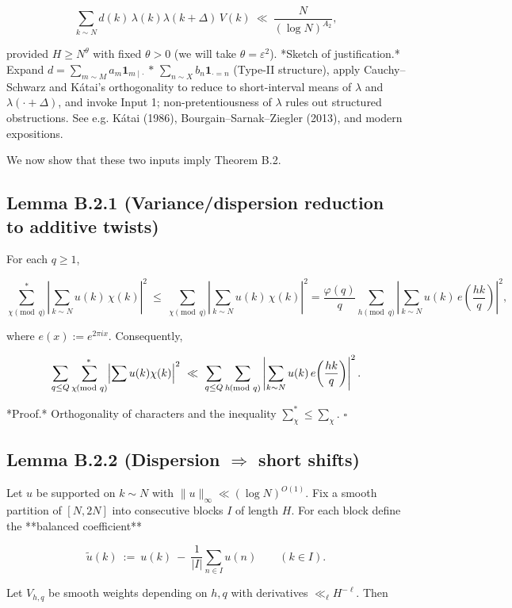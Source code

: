 \documentclass[11pt]{article}
\theoremstyle{definition}
\theoremstyle{remark}
\begin{document}
$$
\sum_{k\sim N} d(k)\,\lambda(k)\lambda(k+\Delta)\,V(k)
\ \ll\ \frac{N}{(\log N)^{A_2}},
$$

provided $H\ge N^{\theta}$ with fixed $\theta>0$ (we will take $\theta=\varepsilon^2$).
*Sketch of justification.* Expand $d=\sum_{m\sim M} a_m \mathbf{1}_{m\mid \cdot}\,*\,\sum_{n\sim X} b_n \mathbf{1}_{\cdot=n}$ (Type-II structure), apply Cauchy–Schwarz and Kátai’s orthogonality to reduce to short-interval means of $\lambda$ and $\lambda(\cdot+\Delta)$, and invoke Input 1; non-pretentiousness of $\lambda$ rules out structured obstructions. See e.g. Kátai (1986), Bourgain–Sarnak–Ziegler (2013), and modern expositions.

We now show that these two inputs imply Theorem B.2.

\subsection*{Lemma B.2.1 (Variance/dispersion reduction to additive twists)}

For each $q\ge 1$,

$$
\sum_{\chi\!\!\!\pmod q}^{\!*}\left|\sum_{k\sim N} u(k)\,\chi(k)\right|^2
\ \le\ \sum_{\chi\!\!\!\pmod q}\left|\sum_{k\sim N} u(k)\,\chi(k)\right|^2
= \frac{\varphi(q)}{q}\sum_{h\!\!\!\pmod q}\left|\sum_{k\sim N} u(k)\,e\!\left(\frac{hk}{q}\right)\right|^2,
$$

where $e(x):=e^{2\pi i x}$. Consequently,

$$
\sum_{q\le Q}\sum_{\chi\!\!\!\pmod q}^{\!*}\Bigl|\sum u(k)\chi(k)\Bigr|^2
\ \ll\ \sum_{q\le Q}\sum_{h\!\!\!\pmod q}\left|\sum_{k\sim N} u(k)\,e\!\left(\frac{hk}{q}\right)\right|^2.
$$

*Proof.* Orthogonality of characters and the inequality $\sum_{\chi}^{*}\le \sum_{\chi}$. $\square$


\subsection*{Lemma B.2.2 (Dispersion $\Rightarrow$ short shifts)}

Let $u$ be supported on $k\sim N$ with $\|u\|_\infty\ll (\log N)^{O(1)}$. Fix a smooth partition of $[N,2N]$ into consecutive blocks $I$ of length $H$. For each block define the **balanced coefficient**

$$
\widetilde{u}(k)\ :=\ u(k)\ -\ \frac{1}{|I|}\sum_{n\in I} u(n)\qquad (k\in I).
$$

Let $V_{h,q}$ be smooth weights depending on $h,q$ with derivatives $\ll_\ell H^{-\ell}$. Then
\end{document}

